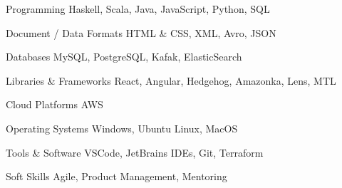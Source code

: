 


\begin{cvskills}


\cvskill
{Programming} %
{Haskell, Scala, Java, JavaScript, Python, SQL} %


\cvskill
{Document / Data Formats} %
{HTML \& CSS, XML, Avro, JSON} %


\cvskill
{Databases} %
{MySQL, PostgreSQL, Kafak, ElasticSearch} %



\cvskill
{Libraries \& Frameworks} %
{React, Angular, Hedgehog, Amazonka, Lens, MTL} %


\cvskill
{Cloud Platforms} %
{AWS} %


\cvskill
{Operating Systems} %
{Windows, Ubuntu Linux, MacOS} %


\cvskill
{Tools \& Software} %
{VSCode, JetBrains IDEs, Git, Terraform} %


\cvskill
{Soft Skills} %
{Agile, Product Management, Mentoring} %


\end{cvskills}
